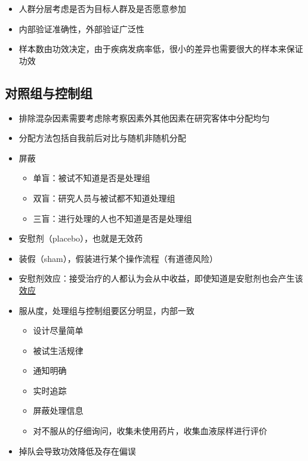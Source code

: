 \documentclass[]{book}
\providecommand{\tightlist}{%
  \setlength{\itemsep}{0pt}\setlength{\parskip}{0pt}}
\begin{document}
\begin{itemize}
\tightlist
\item
  人群分层考虑是否为目标人群及是否愿意参加
\item
  内部验证准确性，外部验证广泛性
\item
  样本数由功效决定，由于疾病发病率低，很小的差异也需要很大的样本来保证功效
\end{itemize}

\hypertarget{ux5bf9ux7167ux7ec4ux4e0eux63a7ux5236ux7ec4}{%
\subsection{对照组与控制组}\label{ux5bf9ux7167ux7ec4ux4e0eux63a7ux5236ux7ec4}}

\begin{itemize}
\tightlist
\item
  排除混杂因素需要考虑除考察因素外其他因素在研究客体中分配均匀
\item
  分配方法包括自我前后对比与随机非随机分配
\item
  屏蔽

  \begin{itemize}
  \tightlist
  \item
    单盲：被试不知道是否是处理组
  \item
    双盲：研究人员与被试都不知道处理组
  \item
    三盲：进行处理的人也不知道是否是处理组
  \end{itemize}
\item
  安慰剂（placebo），也就是无效药
\item
  装假（sham），假装进行某个操作流程（有道德风险）
\item
  安慰剂效应：接受治疗的人都认为会从中收益，即使知道是安慰剂也会产生该\href{http://journals.plos.org/plosone/article?id=10.1371/journal.pone.0015591}{效应}
\item
  服从度，处理组与控制组要区分明显，内部一致

  \begin{itemize}
  \tightlist
  \item
    设计尽量简单
  \item
    被试生活规律
  \item
    通知明确
  \item
    实时追踪
  \item
    屏蔽处理信息
  \item
    对不服从的仔细询问，收集未使用药片，收集血液尿样进行评价
  \end{itemize}
\item
  掉队会导致功效降低及存在偏误
\end{itemize}
\end{document}
